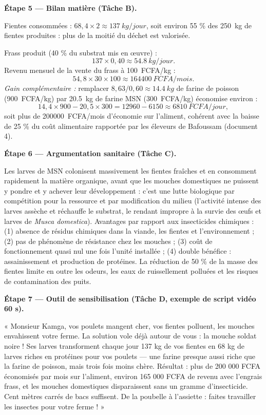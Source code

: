 \documentclass[11pt]{article}
\newcommand{\cle}[1]{{\popxbold\color{popdark}#1}}
\begin{document}
\begin{exoresolu}
\textbf{Étape 5 — Bilan matière (Tâche B).}

Fientes consommées : $68{,}4 \times 2 \approx \SI{137}{kg/jour}$, soit environ 55 \% des \SI{250}{kg} de fientes produites : plus de la moitié du déchet est valorisée.

Frass produit (40 \% du substrat mis en œuvre) :
\[ 137 \times 0{,}40 \approx \SI{54,8}{kg/jour}. \]
Revenu mensuel de la vente du frass à \SI{100}{FCFA/kg} :
\[ 54{,}8 \times 30 \times 100 \approx \SI{164400}{FCFA/mois.} \]
\emph{Gain complémentaire :} remplacer $8{,}63/0{,}60 \approx \SI{14,4}{kg}$ de farine de poisson (\SI{900}{FCFA/kg}) par \SI{20,5}{kg} de farine MSN (\SI{300}{FCFA/kg}) économise environ :
\[ 14{,}4 \times 900 - 20{,}5 \times 300 = \num{12960} - \num{6150} \approx \SI{6810}{FCFA/jour,} \]
soit plus de \SI{200000}{FCFA/mois} d'économie sur l'aliment, cohérent avec la baisse de 25 \% du coût alimentaire rapportée par les éleveurs de Bafoussam (document 4).

\textbf{Étape 6 — Argumentation sanitaire (Tâche C).}

Les larves de MSN colonisent massivement les fientes fraîches et en consomment rapidement la matière organique, avant que les mouches domestiques ne puissent y pondre et y achever leur développement : c'est une \cle{lutte biologique} par compétition pour la ressource et par modification du milieu (l'activité intense des larves assèche et réchauffe le substrat, le rendant impropre à la survie des œufs et larves de \emph{Musca domestica}). Avantages par rapport aux insecticides chimiques : (1) absence de résidus chimiques dans la viande, les fientes et l'environnement ; (2) pas de phénomène de résistance chez les mouches ; (3) coût de fonctionnement quasi nul une fois l'unité installée ; (4) double bénéfice : assainissement et production de protéines. La réduction de 50 \% de la masse des fientes limite en outre les odeurs, les eaux de ruissellement polluées et les risques de contamination des puits.

\textbf{Étape 7 — Outil de sensibilisation (Tâche D, exemple de script vidéo 60 s).}

« Monsieur Kamga, vos poulets mangent cher, vos fientes polluent, les mouches envahissent votre ferme. La solution vole déjà autour de vous : la mouche soldat noire ! Ses larves transforment chaque jour 137 kg de vos fientes en 68 kg de larves riches en protéines pour vos poulets — une farine presque aussi riche que la farine de poisson, mais trois fois moins chère. Résultat : plus de 200 000 FCFA économisés par mois sur l'aliment, environ 165 000 FCFA de revenu avec l'engrais frass, et les mouches domestiques disparaissent sans un gramme d'insecticide. Cent mètres carrés de bacs suffisent. De la poubelle à l'assiette : faites travailler les insectes pour votre ferme ! »
\end{exoresolu}
\end{document}
